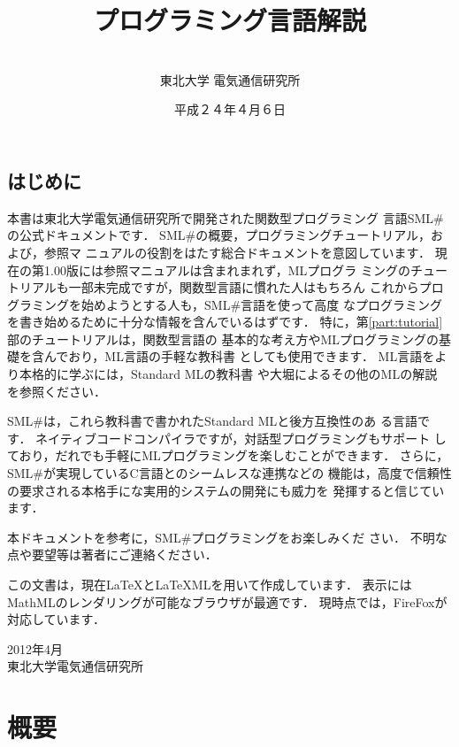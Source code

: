 \documentclass{jbook}
\date{平成２４年４月６日}
\title{プログラミング言語\smlsharp{}解説}
\author{
\authors
\\
東北大学 電気通信研究所
}
\newcommand{\smlsharp}{SML\#}
\newcommand{\version}{1.00}
\newcommand{\authors}{}
\begin{document}
\maketitle

\tableofcontents

\chapter*{はじめに}

	本書は東北大学電気通信研究所で開発された関数型プログラミング
言語\smlsharp{}の公式ドキュメントです．
	\smlsharp{}の概要，プログラミングチュートリアル，および，参照マ
ニュアルの役割をはたす総合ドキュメントを意図しています．
	現在の第\version{}版には参照マニュアルは含まれまれず，MLプログラ
ミングのチュートリアルも一部未完成ですが，関数型言語に慣れた人はもちろん
これからプログラミングを始めようとする人も，\smlsharp{}言語を使って高度
なプログラミングを書き始めるために十分な情報を含んでいるはずです．
	特に，第\ref{part:tutorial}部のチュートリアルは，関数型言語の
基本的な考え方やMLプログラミングの基礎を含んでおり，ML言語の手軽な教科書
としても使用できます．
	ML言語をより本格的に学ぶには，Standard MLの教科書
\cite{ohori00sml}や大堀によるその他のMLの解説
\cite{ohor95jssst,ohor94ipsj}を参照ください．

	\smlsharp{}は，これら教科書で書かれたStandard MLと後方互換性のあ
る言語です．
	ネイティブコードコンパイラですが，対話型プログラミングもサポート
しており，だれでも手軽にMLプログラミングを楽しむことができます．
	さらに，\smlsharp{}が実現しているC言語とのシームレスな連携などの
機能は，高度で信頼性の要求される本格手にな実用的システムの開発にも威力を
発揮すると信じています．

	本ドキュメントを参考に，\smlsharp{}プログラミングをお楽しみくだ
さい．
	不明な点や要望等は著者にご連絡ください．

	この文書は，現在\LaTeX{}とLaTeXMLを用いて作成しています．
	表示にはMathMLのレンダリングが可能なブラウザが最適です．
	現時点では，FireFoxが対応しています．

\begin{flushright}
2012年4月\\
東北大学電気通信研究所\\
\authors
\end{flushright}

\part{概要}
\label{part:outline}
\end{document}
